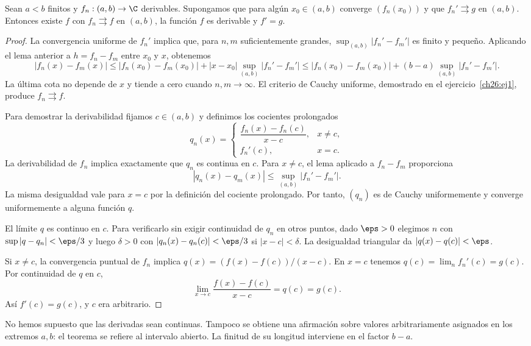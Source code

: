 \begin{teorema}\label{ch26:derivacion}
Sean $a<b$ finitos y $f_n:(a,b)\to\C$ derivables. Supongamos que para algún $x_0\in(a,b)$ converge $(f_n(x_0))$ y que $f_n'\rightrightarrows g$ en $(a,b)$. Entonces existe $f$ con $f_n\rightrightarrows f$ en $(a,b)$, la función $f$ es derivable y $f'=g$.
\end{teorema}
\begin{proof}
La convergencia uniforme de $f_n'$ implica que, para $n,m$ suficientemente grandes, $\sup_{(a,b)}|f_n'-f_m'|$ es finito y pequeño. Aplicando el lema anterior a $h=f_n-f_m$ entre $x_0$ y $x$, obtenemos
\[
 |f_n(x)-f_m(x)|
 \le |f_n(x_0)-f_m(x_0)|+|x-x_0|\sup_{(a,b)}|f_n'-f_m'|
 \le |f_n(x_0)-f_m(x_0)|+(b-a)\sup_{(a,b)}|f_n'-f_m'|.
\]
La última cota no depende de $x$ y tiende a cero cuando $n,m\to\infty$. El criterio de Cauchy uniforme, demostrado en el ejercicio~\ref{ch26:ej1}, produce $f_n\rightrightarrows f$.

Para demostrar la derivabilidad fijamos $c\in(a,b)$ y definimos los cocientes prolongados
\[
 q_n(x)=\begin{cases}
 \dfrac{f_n(x)-f_n(c)}{x-c},&x\ne c,\\[4pt]
 f_n'(c),&x=c.
 \end{cases}
\]
La derivabilidad de $f_n$ implica exactamente que $q_n$ es continua en $c$. Para $x\ne c$, el lema aplicado a $f_n-f_m$ proporciona
\[
 |q_n(x)-q_m(x)|\le\sup_{(a,b)}|f_n'-f_m'|.
\]
La misma desigualdad vale para $x=c$ por la definición del cociente prolongado. Por tanto, $(q_n)$ es de Cauchy uniformemente y converge uniformemente a alguna función $q$.

El límite $q$ es continuo en $c$. Para verificarlo sin exigir continuidad de $q_n$ en otros puntos, dado $\eps>0$ elegimos $n$ con $\sup|q-q_n|<\eps/3$ y luego $\delta>0$ con $|q_n(x)-q_n(c)|<\eps/3$ si $|x-c|<\delta$. La desigualdad triangular da $|q(x)-q(c)|<\eps$.

Si $x\ne c$, la convergencia puntual de $f_n$ implica
$q(x)=(f(x)-f(c))/(x-c)$. En $x=c$ tenemos
$q(c)=\lim_n f_n'(c)=g(c)$. Por continuidad de $q$ en $c$,
\[
 \lim_{x\to c}\frac{f(x)-f(c)}{x-c}=q(c)=g(c).
\]
Así $f'(c)=g(c)$, y $c$ era arbitrario.
\end{proof}

No hemos supuesto que las derivadas sean continuas. Tampoco se obtiene una afirmación sobre valores arbitrariamente asignados en los extremos $a,b$: el teorema se refiere al intervalo abierto. La finitud de su longitud interviene en el factor $b-a$.

